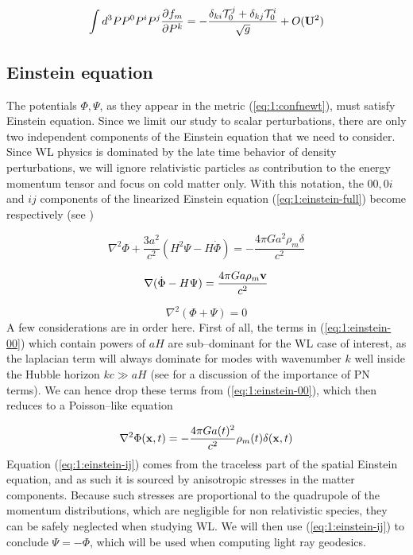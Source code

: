 \begin{equation}
\label{eq:1:boltzmann-mom-1}
\int d^3P P^0P^iP^j \frac{\partial f_m}{\partial P^k} = -\frac{\delta_{ki}\mathcal{T}^j_0 + \delta_{kj}\mathcal{T}^i_0}{\sqrt{g}} + O(\mathbf{U}^2)
\end{equation}

\subsection{Einstein equation}
The potentials $\Phi,\Psi$, as they appear in the metric (\ref{eq:1:confnewt}), must satisfy Einstein equation. Since we limit our study to scalar perturbations, there are only two independent components of the Einstein equation that we need to consider. Since WL physics is dominated by the late time behavior of density perturbations, we will ignore relativistic particles as contribution to the energy momentum tensor and focus on cold matter only. With this notation, the $00,0i$ and $ij$ components of the linearized Einstein equation (\ref{eq:1:einstein-full}) become respectively (see \citep{Dodelson-C5})

\begin{equation}
\label{eq:1:einstein-00}
\nabla^2\Phi +\frac{3a^2}{c^2}(H^2\Psi-H\dot{\Phi}) = -\frac{4\pi Ga^2\rho_m\delta}{c^2}
\end{equation}

\begin{equation}
\label{eq:1:einstein-0i}
\nabla(\dot{\Phi}-H\Psi) = \frac{4\pi Ga\rho_m\mathbf{v}}{c^2}
\end{equation}

\begin{equation}
\label{eq:1:einstein-ij}
\nabla^2(\Phi+\Psi) = 0
\end{equation}
%
A few considerations are in order here. First of all, the terms in (\ref{eq:1:einstein-00}) which contain powers of $aH$ are sub--dominant for the WL case of interest, as the laplacian term will always dominate for modes with wavenumber $k$ well inside the Hubble horizon $kc\gg aH$ (see \citep{PNLensing} for a discussion of the importance of PN terms). We can hence drop these terms from (\ref{eq:1:einstein-00}), which then reduces to a Poisson--like equation 

\begin{equation}
\label{eq:1:poisson}
\nabla^2\Phi(\mathbf{x},t) = -\frac{4\pi Ga(t)^2}{c^2}\rho_m(t)\delta(\mathbf{x},t)
\end{equation}
%
Equation (\ref{eq:1:einstein-ij}) comes from the traceless part of the spatial Einstein equation, and as such it is sourced by anisotropic stresses in the matter components. Because such stresses are proportional to the quadrupole of the momentum distributions, which are negligible for non relativistic species, they can be safely neglected when studying WL. We will then use (\ref{eq:1:einstein-ij}) to conclude $\Psi=-\Phi$, which will be used when computing light ray geodesics. 

